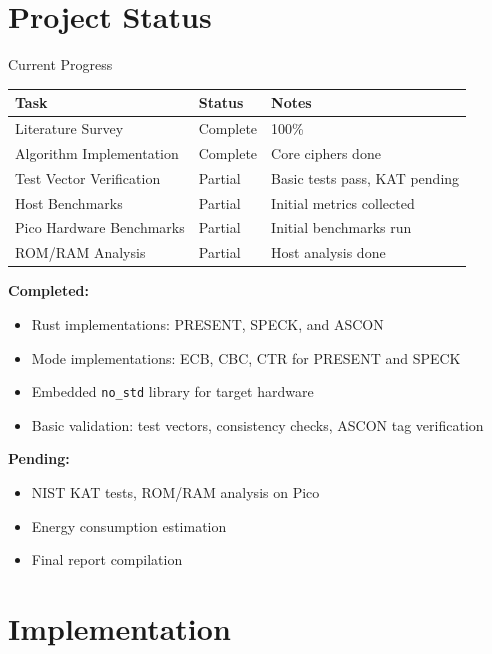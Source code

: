 \documentclass[aspectratio=169]{beamer}
\begin{document}
\section{Project Status}

\begin{frame}{Current Progress}
\small
\begin{tabular}{lll}
\toprule
Task & Status & Notes \\
\midrule
Literature Survey & Complete & 100\% \\
Algorithm Implementation & Complete & Core ciphers done \\
Test Vector Verification & Partial & Basic tests pass, KAT pending \\
Host Benchmarks & Partial & Initial metrics collected \\
Pico Hardware Benchmarks & Partial & Initial benchmarks run \\
ROM/RAM Analysis & Partial & Host analysis done \\
\bottomrule
\end{tabular}

\vspace{0.3cm}
\textbf{Completed:}
\begin{itemize}
    \item Rust implementations: PRESENT, SPECK, and ASCON
    \item Mode implementations: ECB, CBC, CTR for PRESENT and SPECK
    \item Embedded \texttt{no\_std} library for target hardware
    \item Basic validation: test vectors, consistency checks, ASCON tag verification
\end{itemize}

\vspace{0.2cm}
\textbf{Pending:}
\begin{itemize}
    \item NIST KAT tests, ROM/RAM analysis on Pico
    \item Energy consumption estimation
    \item Final report compilation
\end{itemize}
\end{frame}

\section{Implementation}
\end{document}
